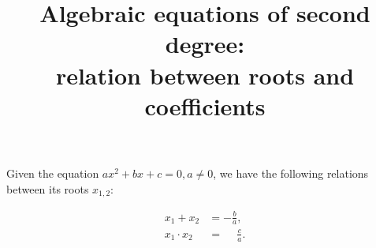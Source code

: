 \documentclass[a4paper,11pt]{article}
\title{Algebraic equations of second degree:\\
relation between roots and coefficients}
\author{}
\date{}
\begin{document}
\maketitle


Given the equation  \( a x^2 + bx + c= 0, a\not=0 \), 
 we have the following relations between its roots 
 \( x_{1,2} \):

\begin{align*}
x_1+x_2 & = -\frac{b}{a},\\
   x_1\cdot x_2 &= \phantom{-}\frac{c}{a}.
\end{align*}
\end{document}
